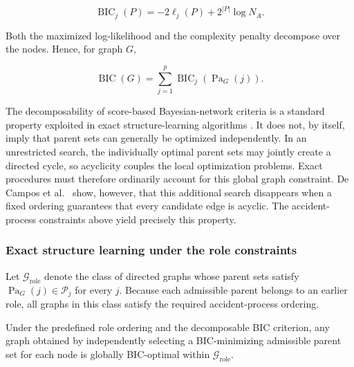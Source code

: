 \[
\operatorname{BIC}_j(P)
=
-2\ell_j(P)
+
2^{|P|}
\log N_A.
\]

Both the maximized log-likelihood and the complexity penalty decompose over
the nodes. Hence, for graph \(G\),

\[
\operatorname{BIC}(G)
=
\sum_{j=1}^{p}
\operatorname{BIC}_j
\left(
\operatorname{Pa}_G(j)
\right).
\]

The decomposability of score-based Bayesian-network criteria is a standard
property exploited in exact structure-learning algorithms
\citep{decampos2009structure}. It does not, by itself, imply that parent sets
can generally be optimized independently. In an unrestricted search, the
individually optimal parent sets may jointly create a directed cycle, so
acyclicity couples the local optimization problems. Exact procedures must
therefore ordinarily account for this global graph constraint. De Campos
et al.~\citep{decampos2009structure} show, however, that this additional
search disappears when a fixed ordering guarantees that every candidate
edge is acyclic. The accident-process constraints above yield precisely this
property.


\subsubsection{Exact structure learning under the role constraints}
\label{sec:chap4_global_bn_exact}

Let \(\mathcal G_{\mathrm{role}}\) denote the class of directed graphs whose
parent sets satisfy
\(\operatorname{Pa}_G(j)\in\mathcal P_j\)
for every \(j\). Because each admissible parent belongs to an earlier role,
all graphs in this class satisfy the required accident-process ordering.

\begin{proposition} Under the predefined role ordering and the decomposable BIC criterion, any graph obtained by independently selecting a BIC-minimizing admissible parent set for each node is globally BIC-optimal within \(\mathcal G_{\mathrm{role}}\).
\end{proposition}


